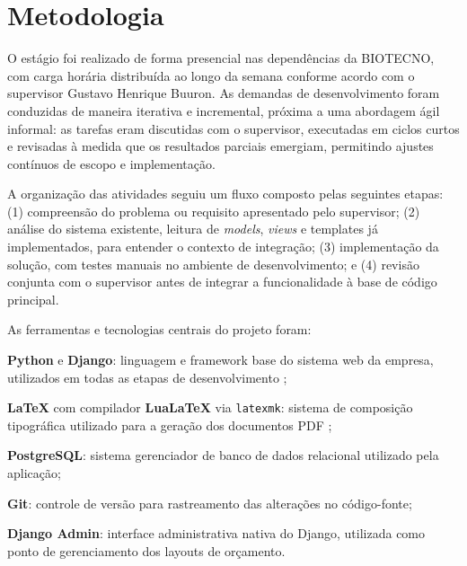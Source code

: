 
\chapter{Metodologia}
\label{cap:metodologia}

O estágio foi realizado de forma presencial nas dependências da BIOTECNO, com carga horária distribuída
ao longo da semana conforme acordo com o supervisor Gustavo Henrique Buuron. As demandas de
desenvolvimento foram conduzidas de maneira iterativa e incremental, próxima a uma abordagem ágil
informal: as tarefas eram discutidas com o supervisor, executadas em ciclos curtos e revisadas à medida
que os resultados parciais emergiam, permitindo ajustes contínuos de escopo e implementação.

A organização das atividades seguiu um fluxo composto pelas seguintes etapas: (1) compreensão do
problema ou requisito apresentado pelo supervisor; (2) análise do sistema existente, leitura de
\textit{models}, \textit{views} e templates já implementados, para entender o contexto de integração;
(3) implementação da solução, com testes manuais no ambiente de desenvolvimento; e (4) revisão conjunta
com o supervisor antes de integrar a funcionalidade à base de código principal.

As ferramentas e tecnologias centrais do projeto foram:

\begin{alineas}
    \item \textbf{Python} e \textbf{Django}: linguagem e framework base do sistema web da empresa,
    utilizados em todas as etapas de desenvolvimento \cite{django2024};
    \item \textbf{LaTeX} com compilador \textbf{LuaLaTeX} via \texttt{latexmk}: sistema de composição
    tipográfica utilizado para a geração dos documentos PDF \cite{latex2023};
    \item \textbf{PostgreSQL}: sistema gerenciador de banco de dados relacional utilizado pela aplicação;
    \item \textbf{Git}: controle de versão para rastreamento das alterações no código-fonte;
    \item \textbf{Django Admin}: interface administrativa nativa do Django, utilizada como ponto de
    gerenciamento dos layouts de orçamento.
\end{alineas}


